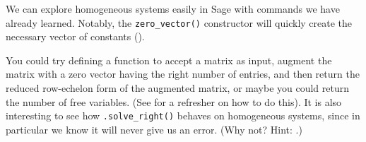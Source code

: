 We can explore homogeneous systems easily in Sage with commands we have already learned.  Notably, the \verb?zero_vector()? constructor will quickly create the necessary vector of constants ().\par
%
You could try defining a function to accept a matrix as input, augment the matrix with a zero vector having the right number of entries, and then return the reduced row-echelon form of the augmented matrix, or maybe you could return the number of free variables. (See  for a refresher on how to do this).  It is also interesting to see how \verb?.solve_right()? behaves on homogeneous systems, since in particular we know it will never give us an error.  (Why not? Hint: .)
%
\begin{sageverbatim}
\end{sageverbatim}
%
